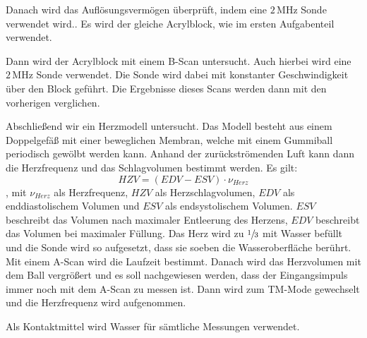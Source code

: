 Danach wird das Auflösungsvermögen überprüft, indem eine $2 \,\si{\mega\hertz}$
Sonde verwendet wird.. Es wird der gleiche Acrylblock, wie im ersten Aufgabenteil verwendet.

Dann wird der Acrylblock mit einem B-Scan untersucht. Auch hierbei wird eine $2 \,\si{\mega\hertz}$
Sonde verwendet. Die Sonde wird dabei mit konstanter Geschwindigkeit über den Block geführt.
Die Ergebnisse dieses Scans werden dann mit den vorherigen verglichen.

Abschließend wir ein Herzmodell untersucht. Das Modell besteht aus
einem Doppelgefäß mit einer beweglichen Membran, welche mit einem Gummiball periodisch gewölbt werden
kann. Anhand der zurückströmenden Luft kann dann die Herzfrequenz und das Schlagvolumen
bestimmt werden. Es gilt:
\begin{equation}
  HZV = (EDV - ESV)\cdot  \nu_{Herz}
  \label{eqn:hzv}
\end{equation}
, mit $\nu_{Herz}$ als Herzfrequenz, $HZV$ als Herzschlagvolumen, $EDV$ als
enddiastolischem Volumen und $ESV$ als endsystolischem Volumen.
$ESV$ beschreibt das Volumen nach maximaler Entleerung des Herzens, $EDV$
beschreibt das Volumen bei maximaler Füllung.
Das Herz wird zu $\sfrac{1}{3}$ mit Wasser befüllt und die Sonde wird so aufgesetzt,
dass sie soeben die Wasseroberfläche berührt. Mit einem A-Scan wird die Laufzeit
bestimmt. Danach wird das Herzvolumen mit dem Ball vergrößert und es soll nachgewiesen
werden, dass der Eingangsimpuls immer noch mit dem A-Scan zu messen ist.
Dann wird zum TM-Mode gewechselt und die Herzfrequenz wird aufgenommen.

Als Kontaktmittel wird Wasser für sämtliche Messungen verwendet.
